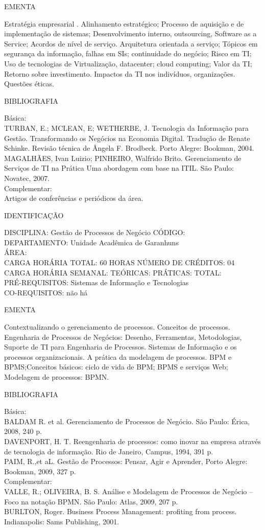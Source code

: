 \documentclass[
	12pt,				%
	openright,			%
  oneside,     %
	a4paper,			%
	english,			%
	french,				%
	spanish,			%
	brazil				%
	]{abntex2}
\begin{document}
\begin{apendicesenv}
EMENTA 

Estratégia empresarial . Alinhamento estratégico; Processo de aquisição
e de implementação de sistemas; Desenvolvimento interno, outsourcing,
Software as a Service; Acordos de nível de serviço. Arquitetura
orientada a serviço; Tópicos em segurança da informação, falhas em SIs;
continuidade do negócio; Risco em TI; Uso de tecnologias de
Virtualização, datacenter; cloud computing; Valor da TI; Retorno sobre
investimento. Impactos da TI nos indivíduos, organizações. Questões
éticas.

BIBLIOGRAFIA 

Básica:\\
TURBAN, E.; MCLEAN, E; WETHERBE, J. Tecnologia da Informação para
Gestão. Transformando os Negócios na Economia Digital. Tradução de
Renate Schinke. Revisão técnica de Ângela F. Brodbeck. Porto Alegre:
Bookman, 2004.\\
MAGALHÃES, Ivan Luizio; PINHEIRO, Walfrido Brito. Gerenciamento de
Serviços de TI na Prática  Uma abordagem com base na ITIL. São
Paulo: Novatec, 2007.\\
Complementar:\\
Artigos de conferências e periódicos da área.

\newpage IDENTIFICAÇÃO

DISCIPLINA: Gestão de Processos de Negócio CÓDIGO:\\ 
DEPARTAMENTO: Unidade Acadêmica de Garanhuns\\
ÁREA: \\
CARGA HORÁRIA TOTAL: 60 HORAS NÚMERO DE CRÉDITOS: 04\\
CARGA HORÁRIA SEMANAL: TEÓRICAS: PRÁTICAS: TOTAL: \\
PRÉ-REQUISITOS: Sistemas de Informação e Tecnologias\\
CO-REQUISITOS: não há

EMENTA 

Contextualizando o gerenciamento de processos. Conceitos de processos.
Engenharia de Processos de Negócios: Desenho, Ferramentas,
Metodologias, Suporte de TI para Engenharia de Processos. Sistemas de
Informação e os processos organizacionais. A prática da modelagem de
processos. BPM e BPMS;Conceitos básicos: ciclo de vida de BPM; BPMS e
serviços Web; Modelagem de processos: BPMN.

BIBLIOGRAFIA 

Básica:\\
BALDAM R. et al. Gerenciamento de Processos de Negócio. São Paulo:
Érica, 2008, 240 p.\\
DAVENPORT, H. T. Reengenharia de processos: como inovar na empresa
através de tecnologia de informação. Rio de Janeiro, Campus, 1994, 391
p.\\
PAIM, R.,et aL. Gestão de Processos: Pensar, Agir e Aprender, Porto
Alegre: Bookman, 2009, 327 p.\\
Complementar:\\
VALLE, R.; OLIVEIRA, B. S. Análise e Modelagem de Processos de Negócio
-- Foco na notação BPMN. São Paulo: Atlas, 2009, 207 p.\\
BURLTON, Roger. Business Process Management: profiting from process.
Indianapolis: Sams Publishing, 2001.


\end{apendicesenv}
\end{document}
